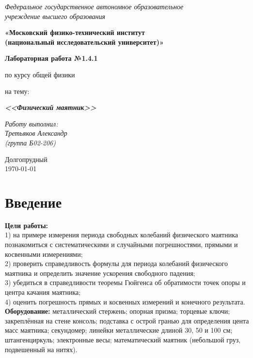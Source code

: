 


	
	\begin{center}
		\textit{Федеральное государственное автономное образовательное\\ учреждение высшего образования }
		
		\vspace{0.5ex}
		
		\textbf{«Московский физико-технический институт\\ (национальный исследовательский университет)»}
	\end{center}
	
	\vspace{10ex}
	
	
	\begin{center}
		\vspace{13ex}
		
		\textbf{Лабораторная работа №1.4.1}
		
		\vspace{1ex}
		
		по курсу общей физики
		
		на тему:
		
		\textbf{\textit{<<Физический маятник>>}}
		
		\vspace{30ex}
		
		\begin{flushright}
			\noindent
			\textit{Работу выполнил:}\\  
			\textit{Третьяков Александр \\(группа Б02-206)}
		\end{flushright}
		\vfill
		Долгопрудный \\ \today
		
	\end{center}
	\newpage	
	
	\section{Введение}
	
	\textbf{Цели работы:} \\1) на примере измерения периода свободных колебаний физического
	маятника познакомиться с систематическими и случайными погрешностями, прямыми и косвенными измерениями; \\2) проверить справедливость формулы для периода колебаний физического маятника и определить значение ускорения свободного падения; \\3) убедиться в справедливости теоремы Гюйгенса об обратимости
	точек опоры и центра качания маятника; \\4) оценить погрешность прямых и косвенных измерений и конечного результата.\\
	\textbf{Оборудование:} металлический стержень; опорная призма; торцевые
	ключи; закреплённая на стене консоль; подставка с острой гранью для определения
	цента масс маятника; секундомер; линейки металлические длиной 30, 50 и 100 см;
	штангенциркуль; электронные весы; математический маятник (небольшой груз,
	подвешенный на нитях).
	
